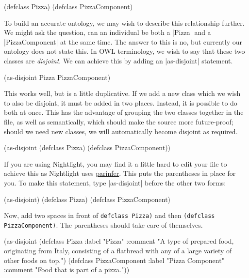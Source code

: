 \begin{tawnyexample}
(defclass Pizza)
(defclass PizzaComponent)
\end{tawnyexample}

To build an accurate ontology, we may wish to describe this relationship
further. We might ask the question, can an individual be both a |Pizza|
and a |PizzaComponent| at the same time. The answer to this is no, but
currently our ontology does not state this. In OWL terminology, we wish
to say that these two classes are \emph{disjoint}. We can achieve this by
adding an |as-disjoint| statement.

\begin{tawnyexample}
(as-disjoint Pizza PizzaComponent)
\end{tawnyexample}

This works well, but is a little duplicative. If we add a new class
which we wish to also be disjoint, it must be added in two places.
Instead, it is possible to do both at once. This has the advantage of
grouping the two classes together in the file, as well as semantically,
which should make the source more future-proof; should we need new
classes, we will automatically become disjoint as required.

\begin{tawnyexample}
(as-disjoint
 (defclass Pizza)
 (defclass PizzaComponent))
\end{tawnyexample}

If you are using Nightlight, you may find it a little hard to edit
your file to achieve this as Nightlight uses
\href{http://shaunlebron.github.io/parinfer/}{parinfer}. This puts the
parentheses in place for you. To make this statement, type
|as-disjoint| before the other two forms:

\begin{tawnyexample}
(as-disjoint)
(defclass Pizza)
(defclass PizzaComponent)
\end{tawnyexample}

Now, add two spaces in front of \lstinline|defclass Pizza)| and then
\lstinline|(defclass PizzaComponent)|. The parentheses should take care of themselves.

\begin{tawny}
(as-disjoint
 (defclass Pizza
   :label "Pizza"
   :comment "A type of prepared food, originating from Italy, consisting of a
flatbread with any of a large variety of other foods on top.")
 (defclass PizzaComponent
   :label "Pizza Component"
   :comment "Food that is part of a pizza."))
\end{tawny}

